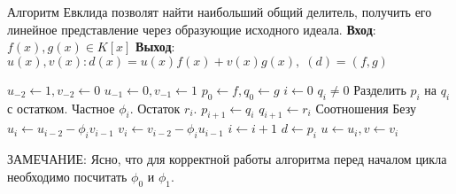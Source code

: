 \pagebreak

Алгоритм Евклида позволят найти наибольший общий делитель, получить его линейное представление через
образующие исходного идеала. {\bf Вход}: $ f(x), g(x) \in K[x] $ \newline
{\bf Выход}: $ u(x), v(x) : d(x) = u(x)f(x) + v(x)g(x), \; (d) = (f,g) $

\begin{codebox}
  \li $ u_{-2} \gets 1, v_{-2} \gets 0 $
  \li $ u_{-1} \gets 0, v_{-1} \gets 1 $
  \li $ p_{0} \gets f, q_{0} \gets g $ 
  \li $ i \gets 0 $
  \li \While $ q_{i} \ne 0 $ 
  \li \Do Разделить $ p_{i} $ на $ q_{i} $ с остатком. 
      \li \Comment Частное $ \phi_{i} $. Остаток $ r_{i} $.
      \li $ p_{i+1} \gets q_{i} $
      \li $ q_{i+1} \gets r_{i} $
      \li \Comment Соотношения Безу
      \li $ u_{i} \gets u_{i-2} - \phi_{i}v_{i-1} $
      \li $ v_{i} \gets v_{i-2} - \phi_{i}u_{i-1} $
      \li $ i \gets i + 1 $
      \End
  \li $ d \gets p_{i} $
  \li $ u \gets u_{i}, v \gets v_{i} $
\end{codebox}

ЗАМЕЧАНИЕ: Ясно, что для корректной работы алгоритма перед началом цикла необходимо посчитать $ \phi_{0} $ и 
$ \phi_{1} $.




